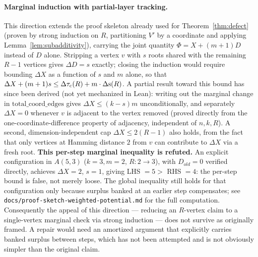\paragraph{Marginal induction with partial-layer tracking.}
This direction extends the proof skeleton already used for
Theorem~\ref{thm:defect} (proven by strong induction on $R$, partitioning
$V'$ by a coordinate and applying Lemma~\ref{lem:subadditivity}), carrying
the joint quantity $\Phi = X + (m+1)D$ instead of $D$ alone. Stripping a
vertex $v$ with $s$ roots shared with the remaining $R-1$ vertices gives
$\Delta D = s$ exactly; closing the induction would require bounding
$\Delta X$ as a function of $s$ and $m$ alone, so that
$\Delta X + (m+1)s \le \Delta \tau_{\mathrm{c}}(R) + m \cdot \Delta \mathrm{s}(R)$. A
partial result toward this bound has since been derived (not yet
mechanized in Lean): writing out the marginal change in
$\mathrm{total\_coord\_edges}$ gives $\Delta X \le (k-s)m$ unconditionally,
and separately $\Delta X = 0$ whenever $v$ is adjacent to the vertex
removed (proved directly from the one-coordinate-difference property of
adjacency, independent of $n,k,R$). A second, dimension-independent cap
$\Delta X \le 2(R-1)$ also holds, from the fact that only vertices at
Hamming distance $2$ from $v$ can contribute to $\Delta X$ via a fresh
root. \textbf{This per-step marginal inequality is refuted.} An explicit
configuration in $A(5,3)$ ($k=3,m=2$, $R:2\to3$), with $D_{old}=0$
verified directly, achieves $\Delta X=2$, $s=1$, giving LHS $=5 >$
RHS $=4$: the per-step bound is false, not merely loose. The global
inequality still holds for that configuration only because surplus
banked at an earlier step compensates; see
\texttt{docs/proof-sketch-weighted-potential.md} for the full computation.
Consequently the appeal of this direction — reducing an $R$-vertex claim
to a single-vertex marginal check via strong induction — does not survive
as originally framed. A repair would need an amortized argument that
explicitly carries banked surplus between steps, which has not been
attempted and is not obviously simpler than the original claim.

